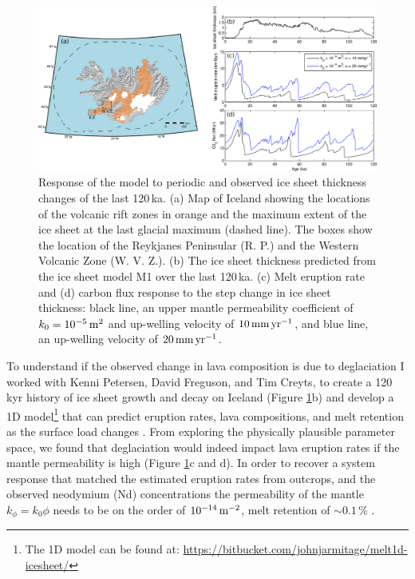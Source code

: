 \begin{figure}
\centering
\includegraphics[width=\textwidth]{./figures/ch2-iceland-map.png}
\caption{Response of the model to periodic and observed ice sheet thickness changes of the last 120\,ka. (a) Map of Iceland showing the locations of the volcanic rift zones in orange and the maximum extent of the ice sheet at the last glacial maximum (dashed line). The boxes show the location of the Reykjanes Peninsular (R. P.) and the Western Volcanic Zone (W. V. Z.). (b) The ice sheet thickness predicted from the ice sheet model M1 over the last 120\,ka. (c) Melt eruption rate and (d) carbon flux response to the step change in ice sheet thickness: black line, an upper mantle permeability coefficient of $k_{0} = 10^{-5}\rm\,m^{2}$ and up-welling velocity of $10\rm\,mm\,yr^{-1}$, and blue line, an up-welling velocity of $20\rm\,mm\,yr^{-1}$.}
\label{fg:iceland-map}
\end{figure}

To understand if the observed change in lava composition is due to deglaciation I worked with Kenni Petersen, David Freguson, and Tim Creyts, to create a 120\,kyr history of ice sheet growth and decay on Iceland (Figure \ref{fg:iceland-map}b) and develop a 1D model\footnote{The 1D model can be found at: \url{https://bitbucket.com/johnjarmitage/melt1d-icesheet/}} that can predict eruption rates, lava compositions, and melt retention as the surface load changes \citep{armitage-etal-grl-2019}. From exploring the physically plausible parameter space, we found that deglaciation would indeed impact lava eruption rates if the mantle permeability is high (Figure \ref{fg:iceland-map}c and d). In order to recover a system response that matched the estimated eruption rates from outcrops, and the observed neodymium (Nd) concentrations the permeability of the mantle $k_{\phi} = k_{0}\phi$ needs to be on the order of $10^{-14}\rm\,m^{-2}$, melt retention of $\sim 0.1$\,\% \citep{armitage-etal-grl-2019}.

